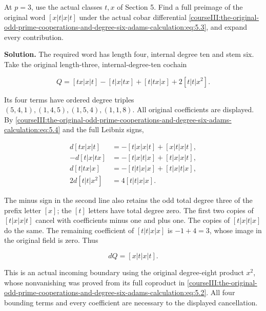 \label{courseIII:odd-coop:7.2}

At \(p=3\), use the actual classes \(t,x\) of Section 5. Find a full preimage of the original word \([x|t|x|t]\) under the actual cobar differential \eqref{courseIII:the-original-odd-prime-cooperations-and-degree-six-adams-calculation:eq:5.3}, and expand every contribution.

\textbf{Solution.} The required word has length four, internal degree ten and stem six. Take the original length-three, internal-degree-ten cochain

\begin{equation}
Q=[tx|x|t]-[t|x|tx]+[t|tx|x]+2[t|t|x^2].
 \label{courseIII:the-original-odd-prime-cooperations-and-degree-six-adams-calculation:eq:7.4}
\end{equation}

Its four terms have ordered degree triples \((5,4,1),(1,4,5),(1,5,4),(1,1,8)\). All original coefficients are displayed. By \eqref{courseIII:the-original-odd-prime-cooperations-and-degree-six-adams-calculation:eq:5.4} and the full Leibniz signs,

\begin{equation}
\begin{aligned}
 d[tx|x|t]&=-[t|x|x|t]+[x|t|x|t],\\
 -d[t|x|tx]&=-[t|x|t|x]+[t|x|x|t],\\
 d[t|tx|x]&=-[t|t|x|x]+[t|x|t|x],\\
 2d[t|t|x^2]&=4[t|t|x|x].
\end{aligned}
\label{courseIII:the-original-odd-prime-cooperations-and-degree-six-adams-calculation:eq:7.5}
\end{equation}

The minus sign in the second line also retains the odd total degree three of the prefix letter \([x]\); the \([t]\) letters have total degree zero. The first two copies of \([t|x|x|t]\) cancel with coefficients minus one and plus one. The copies of \([t|x|t|x]\) do the same. The remaining coefficient of \([t|t|x|x]\) is \(-1+4=3\), whose image in the original field is zero. Thus

\begin{equation}
dQ=[x|t|x|t].
 \label{courseIII:the-original-odd-prime-cooperations-and-degree-six-adams-calculation:eq:7.6}
\end{equation}

This is an actual incoming boundary using the original degree-eight product \(x^2\), whose nonvanishing was proved from its full coproduct in \eqref{courseIII:the-original-odd-prime-cooperations-and-degree-six-adams-calculation:eq:5.2}. All four bounding terms and every coefficient are necessary to the displayed cancellation.

